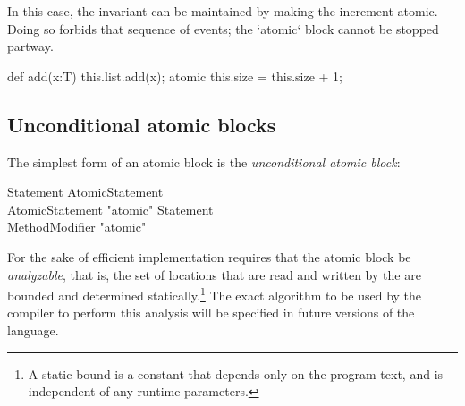 In this case, the invariant can be maintained by making the increment atomic.
Doing so forbids that sequence of events; the \xcd`atomic` block cannot be
stopped partway.  
\begin{xten}
def add(x:T) { 
  this.list.add(x);
  atomic { this.size = this.size + 1; }
}
\end{xten}



\subsection{Unconditional atomic blocks}
The simplest form of an atomic block is the {\em unconditional
atomic block}:

\begin{grammar}
Statement \: AtomicStatement \\
AtomicStatement \: \xcd"atomic"  Statement \\
MethodModifier \: \xcd"atomic" \\
\end{grammar}

For the sake of efficient implementation \XtenCurrVer{} requires
that the atomic block be {\em analyzable}, that is, the set of
locations that are read and written by the  are
bounded and determined statically.\footnote{A static bound is a constant
that depends only on the program text, and is independent 
of any runtime parameters. }
The exact algorithm to be used by
the compiler to perform this analysis will be specified in future
versions of the language.
\tbd{}

